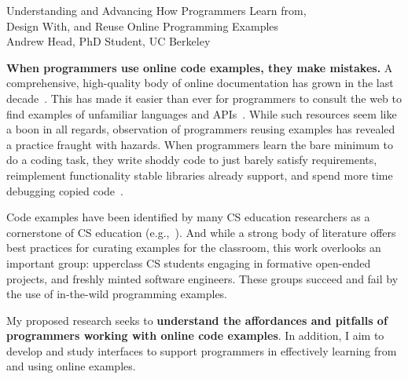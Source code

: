 \documentclass[12pt]{memoir}
\title{}
\author{Andrew Head}
\begin{document}
\begin{center}
Understanding and Advancing How Programmers Learn from,\\ Design With, and Reuse Online Programming Examples\\
\vspace{1ex}
Andrew Head, PhD Student, UC Berkeley
\end{center}
\vspace{-1em}


\textbf{When programmers use online code examples, they make mistakes.}
A comprehensive, high-quality body of online documentation has grown in the last decade~\cite{parnin_crowd_2012,mamykina_design_2011}.
This has made it easier than ever for programmers to consult the web to find examples of unfamiliar languages and APIs~\cite{brandt_two_2009}.
While such resources seem like a boon in all regards, observation of programmers reusing examples has revealed a practice fraught with hazards.
When programmers learn the bare minimum to do a coding task, they write shoddy code to just barely satisfy requirements, reimplement functionality stable libraries already support, and spend more time debugging copied code~\cite{brandt_opportunistic_2008,brandt_two_2009}.

Code examples have been identified by many CS education researchers as a cornerstone of CS education (e.g.,~\cite{lahtinen_study_2005}).
And while a strong body of literature offers best practices for curating examples for the classroom, this work overlooks an important group:
upperclass CS students engaging in formative open-ended projects, and freshly minted software engineers.
These groups succeed and fail by the use of in-the-wild programming examples.


My proposed research seeks to \textbf{understand the affordances and pitfalls of programmers working with online code examples}.
In addition, I aim to develop and study interfaces to support programmers in effectively learning from and using online examples.
\end{document}
